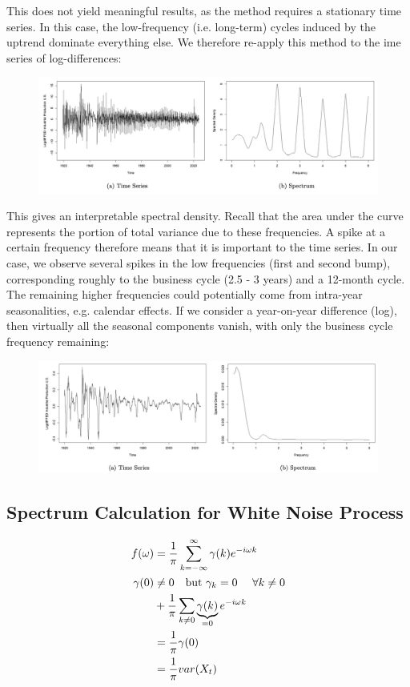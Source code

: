This does not yield meaningful results, as the method requires a stationary time series. In this case, the low-frequency (i.e. long-term) cycles induced by the uptrend dominate everything else. We therefore re-apply this method to the ime series of log-differences: 

\begin{figure}[H]
\includegraphics[scale=0.4]{images/Screenshot 2024-05-06 at 10.39.09.jpg}
\centering
\end{figure}

This gives an interpretable spectral density. Recall that the area under the curve represents the portion of total variance due to these frequencies. A spike at a certain frequency therefore means that it is important to the time series. In our case, we observe several spikes in the low frequencies (first and second bump), corresponding roughly to the business cycle (2.5 - 3 years) and a 12-month cycle. The remaining higher frequencies could potentially come from intra-year seasonalities, e.g. calendar effects. If we consider a year-on-year difference (log), then virtually all the seasonal components vanish, with only the business cycle frequency remaining: 
\begin{figure}[H]
\includegraphics[scale=0.4]{images/Screenshot 2024-05-06 at 10.41.41.jpg}
\centering
\end{figure}




\subsection{Spectrum Calculation for White Noise Process}
\begin{align*}
    f(\omega)&=\frac{1}{\pi} \sum_{k=-\infty}^\infty \gamma(k) e^{-i\omega k}\\
    \gamma(0) & \neq 0 \quad \text{but $\gamma_k = 0$ \quad $\forall k\neq0$} \\
    &+ \frac{1}{\pi} \sum_{k\neq 0} \underbrace{\gamma(k)}_{=0} e^{-i\omega k} \\
    &= \frac{1}{\pi} \gamma(0)\\
    &= \frac{1}{\pi}var(X_t)
\end{align*}

